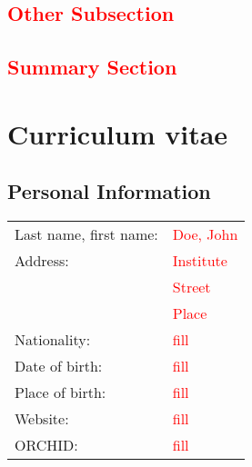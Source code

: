 \documentclass{ercgrant}
\begin{document}
\subsection*{\textcolor{red}{Other Subsection}}

\textcolor{red}{\blindtext[2]}

\subsection*{\textcolor{red}{Summary Section}}

\textcolor{red}{\blindtext[2]}


\nocite{*} %

\renewcommand\bibsection{\subsection*{\refname}}
\begin{small}


\end{small}

\newpage
\section{Curriculum vitae}

\subsection*{Personal Information}
\begin{tabular}{p{5cm}l}
Last name, first name:		& \textcolor{red}{Doe, John}\\[0.1cm]
Address:					& \textcolor{red}{Institute}\\
							& \textcolor{red}{Street}\\
							& \textcolor{red}{Place}\\[0.1cm]
Nationality:				& \textcolor{red}{fill}\\[0.1cm]
Date of birth:				& \textcolor{red}{fill}\\[0.1cm]
Place of birth:				& \textcolor{red}{fill}\\[0.1cm]
Website:					& \textcolor{red}{fill}\\[0.1cm]
ORCHID:						& \textcolor{red}{fill}
\end{tabular}
\end{document}
